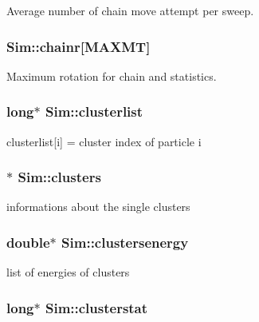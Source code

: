 Average number of chain move attempt per sweep. 

\hypertarget{class_sim_adec41082dfe3aa3210a1fbc5f0ade382}{
\subsubsection[{chainr}]{ Sim\+::chainr\mbox{[}{\bf M\+A\+X\+M\+T}\mbox{]}}}\label{class_sim_adec41082dfe3aa3210a1fbc5f0ade382}


Maximum rotation for chain and statistics. 

\hypertarget{class_sim_a1feddf9821ae3b1082ca29fd60adecca}{
\subsubsection[{clusterlist}]{\setlength{\rightskip}{0pt plus 5cm}long$\ast$ Sim\+::clusterlist}}\label{class_sim_a1feddf9821ae3b1082ca29fd60adecca}


clusterlist\mbox{[}i\mbox{]} = cluster index of particle i 

\hypertarget{class_sim_acb85dbc7776928fe57c9d46972946f70}{
\subsubsection[{clusters}]{$\ast$ Sim\+::clusters}}\label{class_sim_acb85dbc7776928fe57c9d46972946f70}


informations about the single clusters 

\hypertarget{class_sim_a3603ca84a589c3539406b38d7aff2065}{
\subsubsection[{clustersenergy}]{\setlength{\rightskip}{0pt plus 5cm}double$\ast$ Sim\+::clustersenergy}}\label{class_sim_a3603ca84a589c3539406b38d7aff2065}


list of energies of clusters 

\hypertarget{class_sim_a6362e502149a7cd3ed9fb0b0e9a3593e}{
\subsubsection[{clusterstat}]{\setlength{\rightskip}{0pt plus 5cm}long$\ast$ Sim\+::clusterstat}}\label{class_sim_a6362e502149a7cd3ed9fb0b0e9a3593e}


